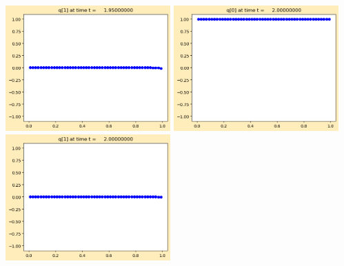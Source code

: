 \documentclass[11pt]{article}
\begin{document}
\includegraphics[width=0.475\textwidth]{frame0039fig1.png}
\vskip 10pt 
\includegraphics[width=0.475\textwidth]{frame0040fig0.png}
\includegraphics[width=0.475\textwidth]{frame0040fig1.png}
\end{document}
